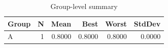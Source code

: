 \begin{table}[htbp]
\centering
\caption{Group-level summary}
\label{tab:group-summary}
\begin{tabular}{lrrrrr}
\toprule
\textbf{Group} & \textbf{N} & \textbf{Mean} & \textbf{Best} & \textbf{Worst} & \textbf{StdDev} \\
\midrule
A & 1 & 0.8000 & 0.8000 & 0.8000 & 0.0000 \\
\bottomrule
\end{tabular}
\end{table}